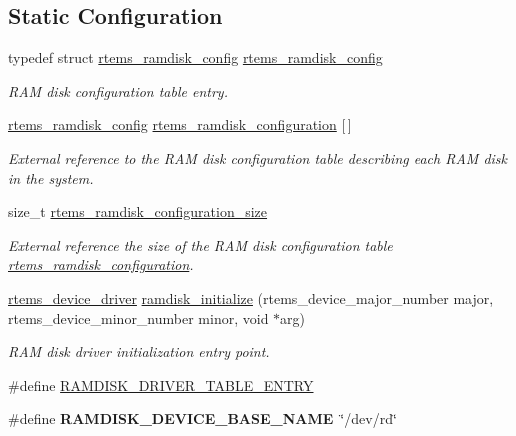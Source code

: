 \subsection*{Static Configuration}
\begin{DoxyCompactItemize}
\item 
\mbox{\label{group__rtems__ramdisk_ga33fc56e07aab97922543593c689203a8}} 
typedef struct \mbox{\hyperlink{structrtems__ramdisk__config}{rtems\+\_\+ramdisk\+\_\+config}} \mbox{\hyperlink{group__rtems__ramdisk_ga33fc56e07aab97922543593c689203a8}{rtems\+\_\+ramdisk\+\_\+config}}
\begin{DoxyCompactList}\small\item\em R\+AM disk configuration table entry. \end{DoxyCompactList}\item 
\mbox{\hyperlink{structrtems__ramdisk__config}{rtems\+\_\+ramdisk\+\_\+config}} \mbox{\hyperlink{group__rtems__ramdisk_ga3f3e285d9218984555c395ae54250e1e}{rtems\+\_\+ramdisk\+\_\+configuration}} \mbox{[}$\,$\mbox{]}
\begin{DoxyCompactList}\small\item\em External reference to the R\+AM disk configuration table describing each R\+AM disk in the system. \end{DoxyCompactList}\item 
size\+\_\+t \mbox{\hyperlink{group__rtems__ramdisk_gae3749836b518adac705d1872e2e2e649}{rtems\+\_\+ramdisk\+\_\+configuration\+\_\+size}}
\begin{DoxyCompactList}\small\item\em External reference the size of the R\+AM disk configuration table \mbox{\hyperlink{group__rtems__ramdisk_ga3f3e285d9218984555c395ae54250e1e}{rtems\+\_\+ramdisk\+\_\+configuration}}. \end{DoxyCompactList}\item 
\mbox{\label{group__rtems__ramdisk_ga8ca1a815fa8cba467668c77eef317d76}} 
\mbox{\hyperlink{group__ClassicStatus_ga545d41846817eaba6143d52ee4d9e9fe}{rtems\+\_\+device\+\_\+driver}} \mbox{\hyperlink{group__rtems__ramdisk_ga8ca1a815fa8cba467668c77eef317d76}{ramdisk\+\_\+initialize}} (rtems\+\_\+device\+\_\+major\+\_\+number major, rtems\+\_\+device\+\_\+minor\+\_\+number minor, void $\ast$arg)
\begin{DoxyCompactList}\small\item\em R\+AM disk driver initialization entry point. \end{DoxyCompactList}\item 
\#define \mbox{\hyperlink{group__rtems__ramdisk_gae871d43a008058aca401c72b2f7f2ccd}{R\+A\+M\+D\+I\+S\+K\+\_\+\+D\+R\+I\+V\+E\+R\+\_\+\+T\+A\+B\+L\+E\+\_\+\+E\+N\+T\+RY}}
\item 
\mbox{\label{group__rtems__ramdisk_ga28d31813af566fa597e1aff5c5b068a3}} 
\#define {\bfseries R\+A\+M\+D\+I\+S\+K\+\_\+\+D\+E\+V\+I\+C\+E\+\_\+\+B\+A\+S\+E\+\_\+\+N\+A\+ME}~\char`\"{}/dev/rd\char`\"{}
\end{DoxyCompactItemize}
